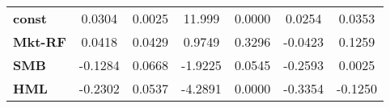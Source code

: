 \begin{center}
\begin{tabular}{lcccccc}
\midrule
\textbf{const}  &       0.0304       &       0.0025       &      11.999     &      0.0000      &       0.0254      &       0.0353       \\
\textbf{Mkt-RF} &       0.0418       &       0.0429       &      0.9749     &      0.3296      &      -0.0423      &       0.1259       \\
\textbf{SMB}    &      -0.1284       &       0.0668       &     -1.9225     &      0.0545      &      -0.2593      &       0.0025       \\
\textbf{HML}    &      -0.2302       &       0.0537       &     -4.2891     &      0.0000      &      -0.3354      &      -0.1250       \\
\bottomrule
\end{tabular}
\end{center}
